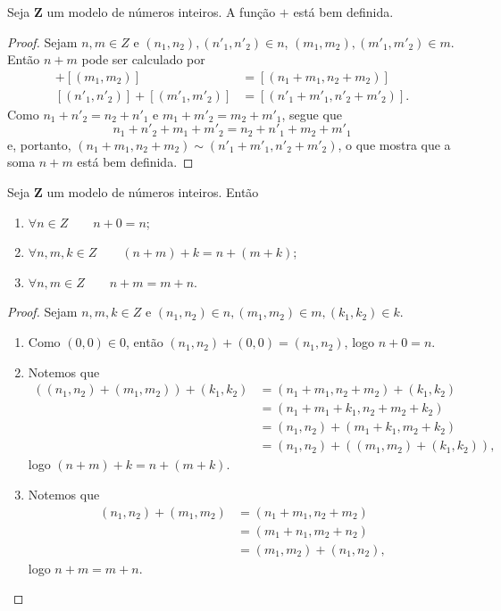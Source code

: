 \begin{theorem}
	Seja $\bm Z$ um modelo de números inteiros. A função $+$ está bem definida.
\end{theorem}
\begin{proof}
	Sejam $n,m \in Z$ e $(n_1,n_2),(n'_1,n'_2) \in n$, $(m_1,m_2),(m'_1,m'_2) \in m$. Então $n+m$ pode ser calculado por
	\begin{align*}
	[(n_1,n_2)]+[(m_1,m_2)] &= [(n_1+m_1,n_2+m_2)] \\
	[(n'_1,n'_2)]+[(m'_1,m'_2)] &= [(n'_1+m'_1,n'_2+m'_2)].
	\end{align*}
Como $n_1+n'_2=n_2+n'_1$ e $m_1+m'_2=m_2+m'_1$, segue que
	\begin{equation*}
	n_1+n'_2+m_1+m'_2=n_2+n'_1+m_2+m'_1
	\end{equation*}
e, portanto, $(n_1+m_1,n_2+m_2) \sim (n'_1+m'_1,n'_2+m'_2)$, o que mostra que a soma $n+m$ está bem definida.
\end{proof}

\begin{proposition}
	Seja $\bm Z$ um modelo de números inteiros. Então
	\begin{enumerate}
	\item $\forall n \in Z \qquad n+0=n$;
	\item $\forall n,m,k \in Z \qquad (n+m)+k=n+(m+k)$;
	\item $\forall n,m \in Z \qquad n+m=m+n$.
	\end{enumerate}
\end{proposition}
\begin{proof} Sejam $n,m,k \in Z$ e $(n_1,n_2) \in n,(m_1,m_2) \in m,(k_1,k_2) \in k$.
	\begin{enumerate}
	\item Como $(0,0) \in 0$, então $(n_1,n_2)+(0,0)=(n_1,n_2)$, logo $n+0=n$.

	\item Notemos que
	\begin{align*}
	((n_1,n_2)+(m_1,m_2))+(k_1,k_2) &= (n_1+m_1,n_2+m_2)+(k_1,k_2) \\
		&= (n_1+m_1+k_1,n_2+m_2+k_2) \\
		&= (n_1,n_2) +(m_1+k_1,m_2+k_2) \\
		&= (n_1,n_2) +((m_1,m_2)+(k_1,k_2)),
	\end{align*}
logo $(n+m)+k=n+(m+k)$.

	\item Notemos que
	\begin{align*}
	(n_1,n_2)+(m_1,m_2) &= (n_1+m_1,n_2+m_2) \\
	&= (m_1+n_1,m_2+n_2) \\
	&= (m_1,m_2) +(n_1,n_2),
	\end{align*}
logo $n+m=m+n$.
	\end{enumerate}
\end{proof}

